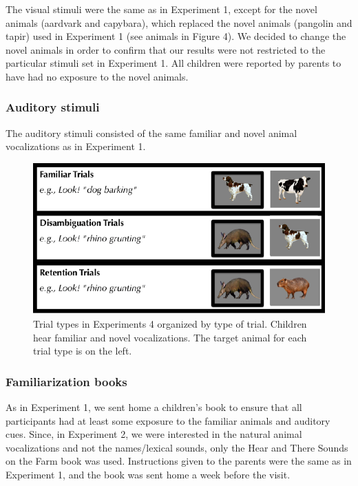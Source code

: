 \documentclass[english,floatsintext,man]{apa6}
\theoremstyle{definition}
\theoremstyle{definition}
\theoremstyle{definition}
\theoremstyle{remark}
\begin{document}
The visual stimuli were the same as in Experiment 1, except for the
novel animals (aardvark and capybara), which replaced the novel animals
(pangolin and tapir) used in Experiment 1 (see animals in Figure 4). We
decided to change the novel animals in order to confirm that our results
were not restricted to the particular stimuli set in Experiment 1. All
children were reported by parents to have had no exposure to the novel
animals.

\hypertarget{auditory-stimuli-1}{%
\subsubsection{Auditory stimuli}\label{auditory-stimuli-1}}

The auditory stimuli consisted of the same familiar and novel animal
vocalizations as in Experiment 1.

\begin{figure}[t]

{\centering \includegraphics[width=0.8\linewidth]{anime_manuscript_files/figure-latex/stimuli-e2-1} 

}

\caption{Trial types in Experiments 4 organized by type of trial. Children hear familiar and novel vocalizations. The target animal for each trial type is on the left.}\label{fig:stimuli-e2}
\end{figure}

\hypertarget{familiarization-books-1}{%
\subsubsection{Familiarization books}\label{familiarization-books-1}}

As in Experiment 1, we sent home a children's book to ensure that all
participants had at least some exposure to the familiar animals and
auditory cues. Since, in Experiment 2, we were interested in the natural
animal vocalizations and not the names/lexical sounds, only the Hear and
There Sounds on the Farm book was used. Instructions given to the
parents were the same as in Experiment 1, and the book was sent home a
week before the visit.
\end{document}
